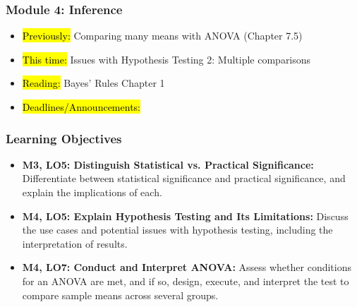 
\begin{frame}
    \frametitle{Module 4: Inference}
    \begin{itemize}
        \item \hl{Previously: }Comparing many means with ANOVA (Chapter 7.5)
        \item \hl{This time: }Issues with Hypothesis Testing 2: Multiple comparisons
        \item \hl{Reading: }Bayes' Rules Chapter 1
        \item \hl{Deadlines/Announcements: }
    \end{itemize}

\end{frame}

\begin{frame}
    \frametitle{Learning Objectives}
    \begin{itemize}
        \item \textbf{M3, LO5: Distinguish Statistical vs. Practical Significance:} Differentiate between statistical significance and practical significance, and explain the implications of each.
        \item \textbf{M4, LO5: Explain Hypothesis Testing and Its Limitations:} Discuss the use cases and potential issues with hypothesis testing, including the interpretation of results.
        \item \textbf{M4, LO7: Conduct and Interpret ANOVA:} Assess whether conditions for an ANOVA are met, and if so, design, execute, and interpret the test to compare sample means across several groups.
    \end{itemize}
\end{frame}
